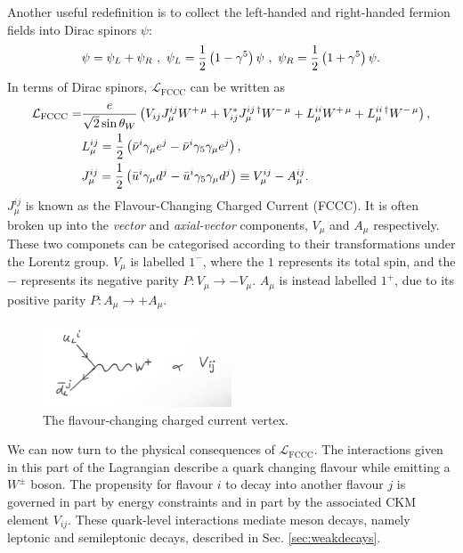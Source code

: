 Another useful redefinition is to collect the left-handed and right-handed fermion fields into Dirac spinors $\psi$:
\begin{align}
  \psi = \psi_L + \psi_R \,\,,\,\, \psi_L = {1\over 2}\left(1-\gamma^5 \right) \psi \,\,,\,\, \psi_R = {1\over 2}\left(1+\gamma^5\right) \psi.
\end{align}
In terms of Dirac spinors, $\mathcal{L}_{\text{FCCC}}$ can be written as
\begin{align}
  \mathcal{L}_{\text{FCCC}} =& {e \over \sqrt{2} \sin \theta_W} \left( V_{ij} J^{ij}_{\mu} W^{+\,\mu} + V^*_{ij} J^{ij\,\dagger}_{\mu} W^{-\,\mu} +
  L^{ii}_{\mu} W^{+\,\mu} + L^{ii\,\dagger}_{\mu} W^{-\,\mu}
  \right), \\ \nonumber
  &L^{ij}_{\mu} = {1\over2}\left(\bar{\nu}^i \gamma_{\mu} e^j - \bar{\nu}^i \gamma_5 \gamma_{\mu} e^j\right), \\ \nonumber
  &J^{ij}_{\mu} = {1\over2}\left(\bar{u}^i \gamma_{\mu} d^j - \bar{u}^i \gamma_5 \gamma_{\mu} d^j\right) \equiv V^{ij}_{\mu} - A^{ij}_{\mu}.
\end{align}
$J^{ij}_{\mu}$ is known as the Flavour-Changing Charged Current (FCCC). It is often broken up into the {\it{vector}} and {\it{axial-vector}} components, $V_{\mu}$ and $A_{\mu}$ respectively. These two componets can be categorised according to their transformations under the Lorentz group. $V_{\mu}$ is labelled $1^-$, where the $1$ represents its total spin, and the $-$ represents its negative parity $P: V_{\mu} \to -V_{\mu}$. $A_{\mu}$ is instead labelled $1^+$, due to its positive parity $P: A_{\mu} \to + A_{\mu}$.

\begin{figure}[tb!]
  \begin{center}
    \vspace{-10pt}
    \includegraphics[width=0.5\textwidth]{images/fccc.jpg}
    \vspace{-10pt}
  \end{center}
  \caption{The flavour-changing charged current vertex.}
  \label{fig:fccc}
\end{figure}

We can now turn to the physical consequences of $\mathcal{L}_{\text{FCCC}}$. The interactions given in this part of the Lagrangian describe a quark changing flavour while emitting a $W^{\pm}$ boson. The propensity for flavour $i$ to decay into another flavour $j$ is governed in part by energy constraints and in part by the associated CKM element $V_{ij}$. These quark-level interactions mediate meson decays, namely leptonic and semileptonic decays, described in Sec. \ref{sec:weakdecays}.

